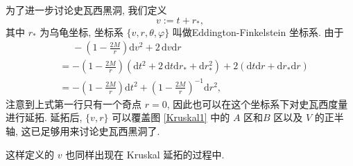 为了进一步讨论史瓦西黑洞, 我们定义
\[ v:=t+r_*, \] 
其中 $r_*$ 为乌龟坐标, 坐标系 $\{v,r,\theta,\varphi\}$ 叫做Eddington-Finkelstein 坐标系. 由于
\begin{align*}
	&\phantom{{}={}}-\left( 1-\frac{2M}{r} \right)\mathrm{d}v^2+2\,\mathrm{d}v \mathrm{d}r\\
	&=-\left( 1-\frac{2M}{r} \right)(\mathrm{d}t^2+2\,\mathrm{d}t\mathrm{d}r_*+\mathrm{d}r_*^2)+2(\mathrm{d}t\mathrm{d}r+\mathrm{d}r_*\mathrm{d}r)\\
	&= -\left(1-\frac{2M}{r}\right)\mathrm{d}t^2+\left( 1-\frac{2M}{r} \right)^{-1}\mathrm{d}r^2,
\end{align*}
注意到上式第一行只有一个奇点 $r=0$, 因此也可以在这个坐标系下对史瓦西度量进行延拓. 延拓后, $\{v,r\}$ 可以覆盖图 \ref{Kruskal1} 中的 $A$ 区和$B$ 区以及 $V$ 的正半轴, 这已足够用来讨论史瓦西黑洞了.

\begin{remark}
	这样定义的 $v$ 也同样出现在 Kruskal 延拓的过程中.
\end{remark}

